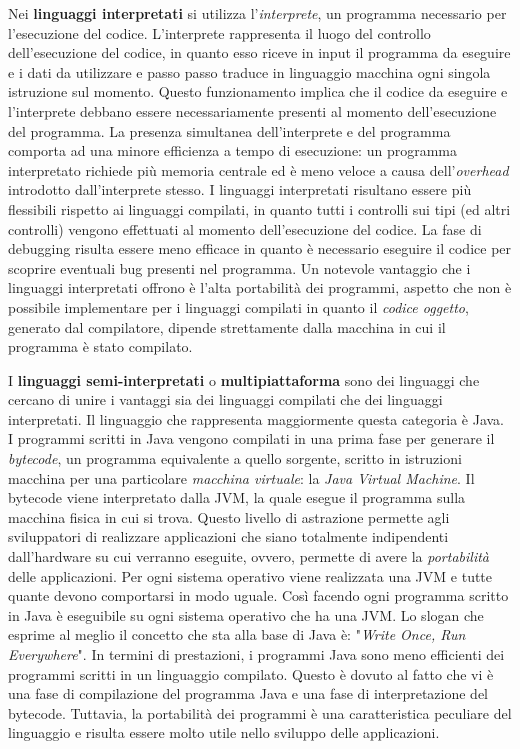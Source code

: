 Nei \textbf{linguaggi interpretati} si utilizza l'\textit{interprete}, un programma necessario per l'esecuzione del codice. L'interprete rappresenta il luogo del controllo dell'esecuzione del codice, in quanto esso riceve in input il programma da eseguire e i dati da utilizzare e passo passo traduce in linguaggio macchina ogni singola istruzione sul momento. Questo funzionamento implica che il codice da eseguire e l'interprete debbano essere necessariamente presenti al momento dell'esecuzione del programma. La presenza simultanea dell'interprete e del programma comporta ad una minore efficienza a tempo di esecuzione: un programma interpretato richiede più memoria centrale ed è meno veloce a causa dell'\textit{overhead} introdotto dall'interprete stesso. I linguaggi interpretati risultano essere più flessibili rispetto ai linguaggi compilati, in quanto tutti i controlli sui tipi (ed altri controlli) vengono effettuati al momento dell'esecuzione del codice. La fase di debugging risulta essere meno efficace in quanto è necessario eseguire il codice per scoprire eventuali bug presenti nel programma. Un notevole vantaggio che i linguaggi interpretati offrono è l'alta portabilità dei programmi, aspetto che non è possibile implementare per i linguaggi compilati in quanto il \textit{codice oggetto}, generato dal compilatore, dipende strettamente dalla macchina in cui il programma è stato compilato.

I \textbf{linguaggi semi-interpretati} o \textbf{multipiattaforma} sono dei linguaggi che cercano di unire i vantaggi sia dei linguaggi compilati che dei linguaggi interpretati. Il linguaggio che rappresenta maggiormente questa categoria è Java. I programmi scritti in Java vengono compilati in una prima fase per generare il \textit{bytecode}, un programma equivalente a quello sorgente, scritto in istruzioni macchina per una particolare \textit{macchina virtuale}: la \textit{Java Virtual Machine}. Il bytecode viene interpretato dalla JVM, la quale esegue il programma sulla macchina fisica in cui si trova. Questo livello di astrazione permette agli sviluppatori di realizzare applicazioni che siano totalmente indipendenti dall'hardware su cui verranno eseguite, ovvero, permette di avere la \textit{portabilità} delle applicazioni. Per ogni sistema operativo viene realizzata una JVM e tutte quante devono comportarsi in modo uguale. Così facendo ogni programma scritto in Java è eseguibile su ogni sistema operativo che ha una JVM. Lo slogan che esprime al meglio il concetto che sta alla base di Java è: "\textit{Write Once, Run Everywhere}". In termini di prestazioni, i programmi Java sono meno efficienti dei programmi scritti in un linguaggio compilato. Questo è dovuto al fatto che vi è una fase di compilazione del programma Java e una fase di interpretazione del bytecode. Tuttavia, la portabilità dei programmi è una caratteristica peculiare del linguaggio e risulta essere molto utile nello sviluppo delle applicazioni.

